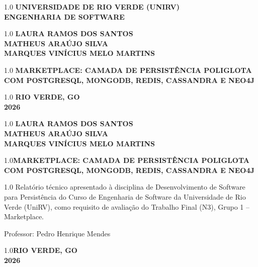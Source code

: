 \documentclass[12pt,a4paper,oneside]{article}
\newcommand{\PessoaUm}{Laura Ramos dos Santos}
\newcommand{\PessoaDois}{Matheus Araújo Silva}
\newcommand{\PessoaTres}{Marques Vinícius Melo Martins}
\newcommand{\Professor}{Pedro Henrique Mendes}
\newcommand{\Titulo}{Marketplace: camada de persistência poliglota com PostgreSQL, MongoDB, Redis, Cassandra e Neo4j}
\begin{document}

\pagestyle{semnum}

\thispagestyle{semnum}
\begin{center}
\begin{spacing}{1.0}
{\bfseries\MakeUppercase{Universidade de Rio Verde (UniRV)}}\\[4pt]
{\bfseries\MakeUppercase{Engenharia de Software}}
\end{spacing}
\vfill
\begin{spacing}{1.0}
{\bfseries\MakeUppercase{\PessoaUm}}\\[4pt]
{\bfseries\MakeUppercase{\PessoaDois}}\\[4pt]
{\bfseries\MakeUppercase{\PessoaTres}}
\end{spacing}
\vfill\vfill
\begin{spacing}{1.0}
{\bfseries\MakeUppercase{\Titulo}}
\end{spacing}
\vfill\vfill\vfill
\begin{spacing}{1.0}
{\bfseries\MakeUppercase{Rio Verde, GO}}\\
{\bfseries\MakeUppercase{2026}}
\end{spacing}
\end{center}

\newpage\thispagestyle{semnum}
\begin{center}
\begin{spacing}{1.0}
{\bfseries\MakeUppercase{\PessoaUm}}\\[4pt]
{\bfseries\MakeUppercase{\PessoaDois}}\\[4pt]
{\bfseries\MakeUppercase{\PessoaTres}}
\end{spacing}
\end{center}
\vfill
\begin{center}
\begin{spacing}{1.0}{\bfseries\MakeUppercase{\Titulo}}\end{spacing}
\end{center}
\vspace{2\baselineskip}
\hspace{8cm}\begin{minipage}{\dimexpr\textwidth-8cm\relax}
\begin{spacing}{1.0}\small
Relatório técnico apresentado à disciplina de Desenvolvimento de Software para Persistência do Curso de Engenharia de Software da Universidade de Rio Verde (UniRV), como requisito de avaliação do Trabalho Final (N3), Grupo 1 -- Marketplace.
\vspace{12pt}

Professor: \Professor
\end{spacing}
\end{minipage}
\vfill\vfill
\begin{center}\begin{spacing}{1.0}{\bfseries\MakeUppercase{Rio Verde, GO}}\\[4pt]{\bfseries\MakeUppercase{2026}}\end{spacing}\end{center}
\end{document}

